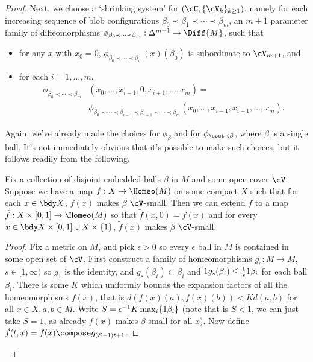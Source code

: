 \begin{proof}
Next, we choose a `shrinking system' for $\left(\cU,\{\cV_k\}_{k \geq 1}\right)$, namely for each increasing sequence of blob configurations
$\beta_0 \prec \beta_1 \prec \cdots \prec \beta_m$, an $m+1$ parameter family of diffeomorphisms
$\phi_{\beta_0 \prec \cdots \prec \beta_m} : \Delta^{m+1} \to \Diff{M}$, such that
\begin{itemize}
\item for any $x$ with $x_0 = 0$, $\phi_{\beta_0 \prec \cdots \prec \beta_m}(x)(\beta_0)$ is subordinate to $\cV_{m+1}$, and
\item for each $i = 1, \ldots, m$,
\begin{align*}
\phi_{\beta_0 \prec \cdots \prec \beta_m}&(x_0, \ldots, x_{i-1},0,x_{i+1},\ldots,x_m) = \\ &\phi_{\beta_0 \prec \cdots \prec \beta_{i-1} \prec \beta_{i+1} \prec \cdots \prec \beta_m}(x_0,\ldots, x_{i-1},x_{i+1},\ldots,x_m).
\end{align*}
\end{itemize}
Again, we've already made the choices for $\phi_{\beta}$ and for $\phi_{\eset \prec \beta}$, where $\beta$ is a single ball. It's not immediately obvious that it's possible to make such choices, but it follows readily from the following.

\begin{lem}
\label{lem:extend-small-homeomorphisms}
Fix a collection of disjoint embedded balls $\beta$ in $M$ and some open cover $\cV$. Suppose we have a map $f :  X \to \Homeo(M)$ on some compact $X$ such that for each $x \in \bdy X$, $f(x)$ makes $\beta$ $\cV$-small. Then we can extend $f$ to a map $\tilde{f} : X \times [0,1] \to \Homeo(M)$ so that $\tilde{f}(x,0) = f(x)$ and for every $x \in \bdy X \times [0,1] \cup X \times \{1\}$, $\tilde{f}(x)$ makes $\beta$ $\cV$-small.
\end{lem}
\begin{proof}
Fix a metric on $M$, and pick $\epsilon > 0$ so every $\epsilon$ ball in $M$ is contained in some open set of $\cV$. First construct a family of homeomorphisms $g_s : M \to M$, $s \in [1,\infty)$ so $g_1$ is the identity, and $g_s(\beta_i) \subset \beta_i$ and $1 g_s(\beta_i) \leq \frac{1}{s} 1 \beta_i$ for each ball $\beta_i$. 
There is some $K$ which uniformly bounds the expansion factors of all the homeomorphisms $f(x)$, that is $d(f(x)(a), f(x)(b)) < K d(a,b)$ for all $x \in X, a,b \in M$. Write $S=\epsilon^{-1} K \max_i \{1 \beta_i\}$ (note that is $S<1$, we can just take $S=1$, as already $f(x)$ makes $\beta$ small for all $x$). Now define $\tilde{f}(t, x) = f(x) \compose g_{(S-1)t+1}$.


\end{proof}
\end{proof}
